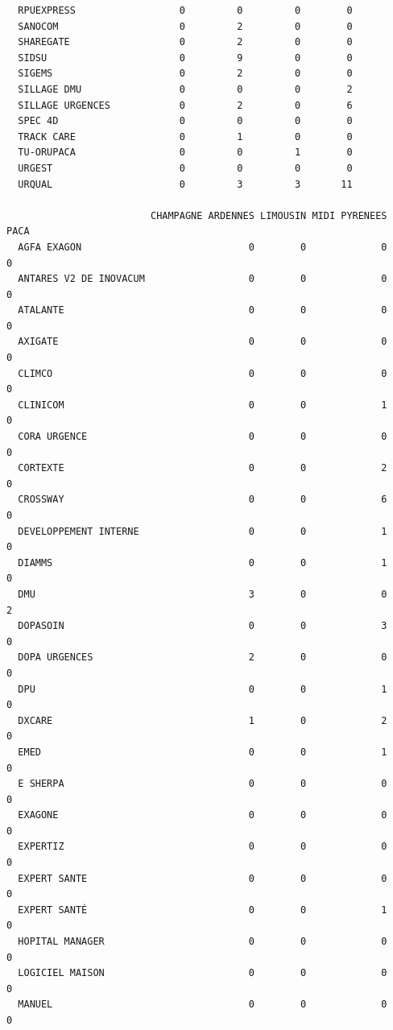 \documentclass[]{article}
\begin{document}
\begin{verbatim}
  RPUEXPRESS                  0         0         0        0
  SANOCOM                     0         2         0        0
  SHAREGATE                   0         2         0        0
  SIDSU                       0         9         0        0
  SIGEMS                      0         2         0        0
  SILLAGE DMU                 0         0         0        2
  SILLAGE URGENCES            0         2         0        6
  SPEC 4D                     0         0         0        0
  TRACK CARE                  0         1         0        0
  TU-ORUPACA                  0         0         1        0
  URGEST                      0         0         0        0
  URQUAL                      0         3         3       11
                        
                         CHAMPAGNE ARDENNES LIMOUSIN MIDI PYRENEES PACA
  AGFA EXAGON                             0        0             0    0
  ANTARES V2 DE INOVACUM                  0        0             0    0
  ATALANTE                                0        0             0    0
  AXIGATE                                 0        0             0    0
  CLIMCO                                  0        0             0    0
  CLINICOM                                0        0             1    0
  CORA URGENCE                            0        0             0    0
  CORTEXTE                                0        0             2    0
  CROSSWAY                                0        0             6    0
  DEVELOPPEMENT INTERNE                   0        0             1    0
  DIAMMS                                  0        0             1    0
  DMU                                     3        0             0    2
  DOPASOIN                                0        0             3    0
  DOPA URGENCES                           2        0             0    0
  DPU                                     0        0             1    0
  DXCARE                                  1        0             2    0
  EMED                                    0        0             1    0
  E SHERPA                                0        0             0    0
  EXAGONE                                 0        0             0    0
  EXPERTIZ                                0        0             0    0
  EXPERT SANTE                            0        0             0    0
  EXPERT SANTÉ                            0        0             1    0
  HOPITAL MANAGER                         0        0             0    0
  LOGICIEL MAISON                         0        0             0    0
  MANUEL                                  0        0             0    0

\end{verbatim}
\end{document}

